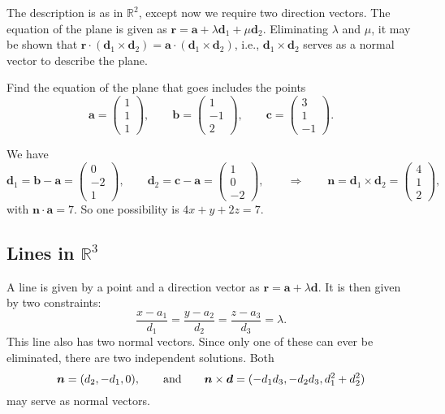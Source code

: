 \documentclass[10pt,notitlepage]{revtex4-1}
\newenvironment{example}[1][Example]{\begin{trivlist}
\item[\hskip \labelsep {\bfseries #1}]}{\end{trivlist}}
\newcommand{\ab}{{\boldsymbol{a}}}
\newcommand{\bb}{{\boldsymbol{b}}}
\newcommand{\cb}{{\boldsymbol{c}}}
\newcommand{\db}{{\boldsymbol{d}}}
\newcommand{\nb}{{\boldsymbol{n}}}
\begin{document}
The description is as in $\mathbb{R}^2$, except now we require two direction
vectors. The equation of the plane is given as $\boldsymbol{r}=\ab+\lambda\db_1
+ \mu\db_2$. Eliminating $\lambda$ and $\mu$, it may be shown that
$\boldsymbol{r}\cdot(\db_1\times\db_2) =\ab\cdot(\db_1\times\db_2)$, i.e.,
$\db_1\times\db_2$ serves as a normal vector to describe the plane.
\begin{example}
	Find the equation of the plane that goes includes the points
	\begin{equation}
		\ab=\begin{pmatrix}1\\1\\1\end{pmatrix},\qquad
		\bb=\begin{pmatrix}1\\-1\\2\end{pmatrix},\qquad
		\cb=\begin{pmatrix}3\\1\\-1\end{pmatrix}.
	\end{equation}
	
	We have
	\begin{equation}
		\db_1=\bb-\ab=\begin{pmatrix}0\\-2\\1\end{pmatrix},\qquad
		\db_2=\cb-\ab=\begin{pmatrix}1\\0\\-2\end{pmatrix},\qquad\Rightarrow
		\qquad \nb=\db_1\times\db_2=\begin{pmatrix}4\\1\\2\end{pmatrix},
	\end{equation}
	with $\nb\cdot\ab=7$. So one possibility is $4x+y+2z=7$.
\end{example}


\subsection{Lines in $\mathbb{R}^3$}

A line is given by a point and a direction vector as
$\boldsymbol{r}=\ab+\lambda\db$. It is then given by two constraints:
\begin{equation}
	\frac{x-a_1}{d_1}=\frac{y-a_2}{d_2}=\frac{z-a_3}{d_3}=\lambda.
\end{equation}
This line also has two normal vectors. Since only one of these can ever be
eliminated, there are two independent solutions. Both
\begin{equation}
	\nb=(d_2, -d_1, 0),\qquad\textnormal{and}\qquad
	\nb\times\db=(-d_1 d_3, -d_2 d_3, d_1^2 + d_2^2)
\end{equation}
may serve as normal vectors.
\end{document}
